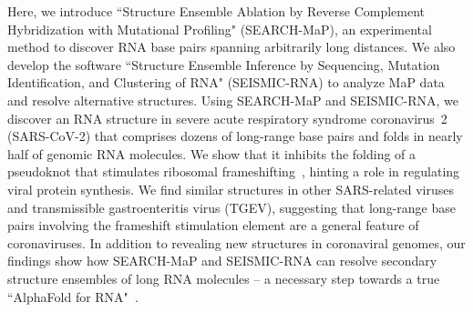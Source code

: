\documentclass[main.tex]{subfiles}
\begin{document}
Here, we introduce ``Structure Ensemble Ablation by Reverse Complement Hybridization with Mutational Profiling" (SEARCH-MaP), an experimental method to discover RNA base pairs spanning arbitrarily long distances.
We also develop the software ``Structure Ensemble Inference by Sequencing, Mutation Identification, and Clustering of RNA" (SEISMIC-RNA) to analyze MaP data and resolve alternative structures.
Using SEARCH-MaP and SEISMIC-RNA, we discover an RNA structure in severe acute respiratory syndrome coronavirus~2 (SARS-CoV-2) that comprises dozens of long-range base pairs and folds in nearly half of genomic RNA molecules.
We show that it inhibits the folding of a pseudoknot that stimulates ribosomal frameshifting~\cite{Kelly2020,KZhang2021}, hinting a role in regulating viral protein synthesis.
We find similar structures in other SARS-related viruses and transmissible gastroenteritis virus (TGEV), suggesting that long-range base pairs involving the frameshift stimulation element are a general feature of coronaviruses.
In addition to revealing new structures in coronaviral genomes, our findings show how SEARCH-MaP and SEISMIC-RNA can resolve secondary structure ensembles of long RNA molecules -- a necessary step towards a true ``AlphaFold for RNA"~\cite{Schneider2023}.
\end{document}
